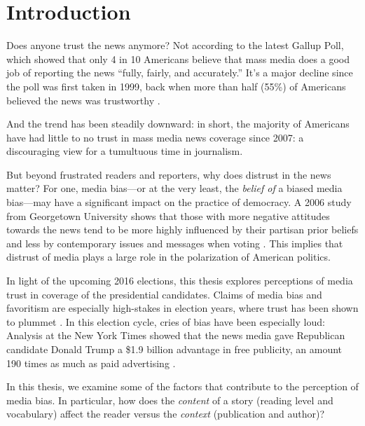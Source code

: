 
\chapter{Introduction} 

Does anyone trust the news anymore? Not according to the latest Gallup Poll, which showed that only 4 in 10 Americans believe that mass media does a good job of reporting the news ``fully, fairly, and accurately.'' It's a major decline since the poll was first taken in 1999, back when more than half (55\%) of Americans believed the news was trustworthy \cite{Gallup-trust-2015}.

And the trend has been steadily downward: in short, the majority of Americans have had little to no trust in mass media news coverage since 2007: a discouraging view for a tumultuous time in journalism.

But beyond frustrated readers and reporters, why does distrust in the news matter? For one, media bias---or at the very least, the \emph{belief of} a biased media bias---may have a significant impact on the practice of democracy. A 2006 study from Georgetown University shows that those with more negative attitudes towards the news tend to be more highly influenced by their partisan prior beliefs and less by contemporary issues and messages when voting \cite{ladd2005attitudes}. This implies that distrust of media plays a large role in the polarization of American politics.

In light of the upcoming 2016 elections, this thesis explores perceptions of media trust in coverage of the presidential candidates. Claims of media bias and favoritism are especially high-stakes in election years, where trust has been shown to plummet \cite{Gallup-trust-2015}. In this election cycle, cries of bias have been especially loud: Analysis at the New York Times showed that the news media gave Republican candidate Donald Trump a \$1.9 billion advantage in free publicity, an amount 190 times as much as paid advertising \cite{Trump-advantage}.

In this thesis, we examine some of the factors that contribute to the perception of media bias. In particular, how does the \emph{content} of a story (reading level and vocabulary) affect the reader versus the \emph{context} (publication and author)? 

